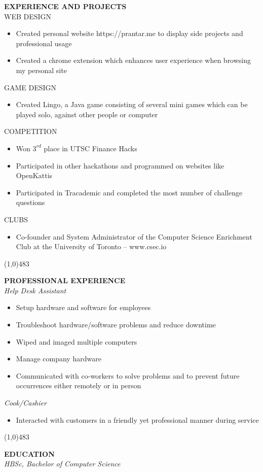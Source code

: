 \documentclass[10pt,oneside]{article}
\begin{document}
        
        \large{\textbf{EXPERIENCE AND PROJECTS}}\\
        \large{WEB DESIGN}\\
        \begin{itemize}
            \item Created personal website https://prantar.me to display side projects and professional usage
            \item Created a chrome extension which enhances user experience when browsing my personal site
        \end{itemize}
        \large{GAME DESIGN}\\
        \begin{itemize}
            \item Created Lingo, a Java game consisting of several mini games which can be played solo, against other people or computer
        \end{itemize}
        \large{COMPETITION}
        \begin{itemize}
            \item Won \(3^{rd}\) place in UTSC Finance Hacks
            \item Participated in other hackathons and programmed on websites like OpenKattis
            \item Participated in Tracademic and completed the most number of challenge questions
        \end{itemize}
        \large{CLUBS}
        \begin{itemize}
            \item Co-founder and System Administrator of the Computer Science Enrichment Club at the University of Toronto – www.csec.io
        \end{itemize}
        \line(1,0){483}
        
        
        \large{\textbf{PROFESSIONAL EXPERIENCE}}\\
        \makebox[\textwidth][c]{}%
        \textit{Help Desk Assistant}
        \begin{itemize}
            \item Setup hardware and software for employees
            \item Troubleshoot hardware/software problems and reduce downtime
            \item Wiped and imaged multiple computers
            \item Manage company hardware
            \item Communicated with co-workers to solve problems and to prevent future occurrences either remotely or in person
        \end{itemize}
        \makebox[\textwidth][c]{}%
        \textit{Cook/Cashier}
        \begin{itemize}
            \item Interacted with customers in a friendly yet professional manner during service
        \end{itemize}
        \line(1,0){483}
        
        
        \large{\textbf{EDUCATION}}\\
        \makebox[\textwidth][c]{}%
        \textit{ HBSc, Bachelor of Computer Science}
    
\end{document}
